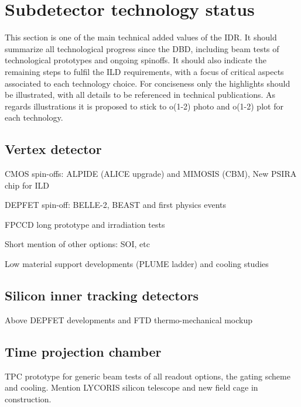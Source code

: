 \vspace{2cm}
\section{Subdetector technology status}

This section is one of the main technical added values of the IDR. It should summarize all technological progress since the DBD, including beam tests of technological prototypes and ongoing spinoffs. It should also indicate the remaining steps to fulfil the ILD requirements, with a focus of critical aspects associated to each technology choice. For conciseness only the highlights should be illustrated, with all details to be referenced in technical publications. As regards illustrations it is proposed to stick to o(1-2) photo and o(1-2) plot  for each technology. 

\vspace{2cm}
\subsection{Vertex detector}

CMOS spin-offs: ALPIDE (ALICE upgrade) and MIMOSIS (CBM), New PSIRA chip for ILD

DEPFET spin-off: BELLE-2, BEAST and first physics events

FPCCD long prototype and irradiation tests

Short mention of other options:  SOI, etc

Low material support developments (PLUME ladder) and cooling studies

\vspace{2cm}
\subsection{Silicon inner tracking detectors}

Above DEPFET developments and FTD thermo-mechanical mockup

\vspace{2cm}
\subsection{Time projection chamber}

TPC prototype for generic beam tests of all readout options, the gating scheme and cooling. Mention LYCORIS silicon telescope and new field cage in construction.

